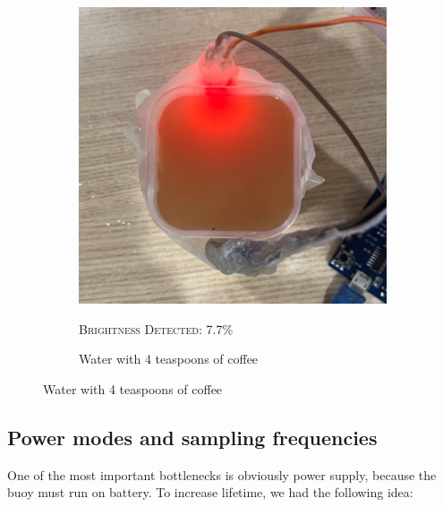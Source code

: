 \documentclass{article}
\begin{document}
\begin{figure}[H]
\begin{subfigure}{.33\textwidth}
        \centering
        \includegraphics[width=.8\linewidth]{report/images/murky_water_very_poor.jpg}
        \caption{Water with 4 teaspoons of coffee}
        \textsc{Brightness Detected: 7.7\%}
    \end{subfigure}
\end{figure}

\subsection{Power modes and sampling frequencies}

One of the most important bottlenecks is obviously power supply, because the buoy must run on battery. To increase lifetime, we had the following idea:
\end{document}
